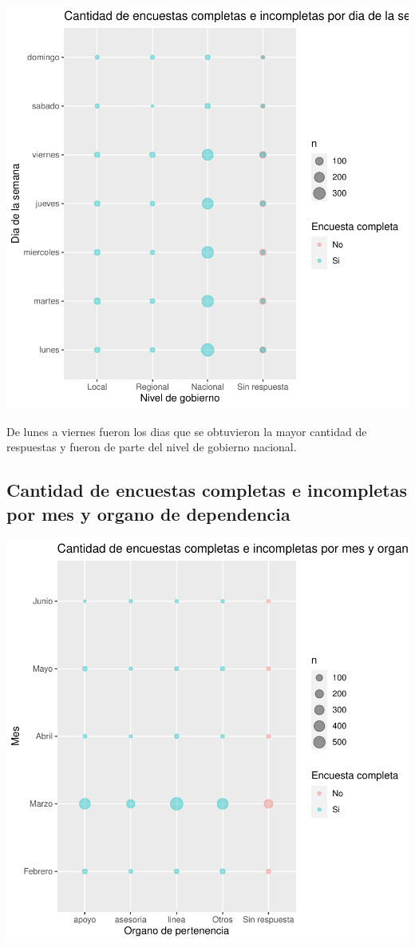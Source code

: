 \documentclass{article}
\begin{document}
\includegraphics{seguimientov3-024}

De lunes a viernes fueron los dias que se obtuvieron la mayor cantidad de respuestas y fueron de parte del nivel de gobierno nacional.

\subsection{Cantidad de encuestas completas e incompletas por mes y organo de dependencia}

\includegraphics{seguimientov3-025}
\end{document}
